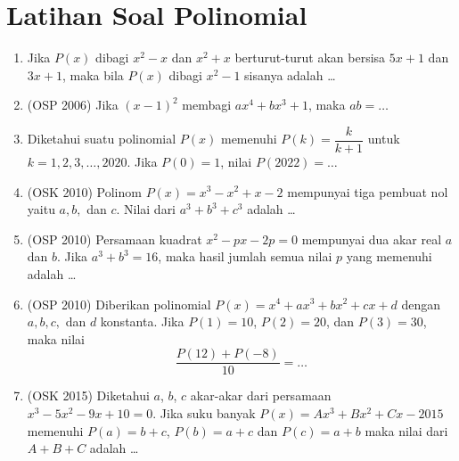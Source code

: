 \documentclass[12pt]{scrartcl}
\begin{document}
\section{Latihan Soal Polinomial}
\begin{enumerate}

\item Jika $P(x)$ dibagi $x^2-x$ dan $x^2+x$ berturut-turut akan bersisa $5x+1$ dan $3x+1$, maka bila $P(x)$ dibagi $x^2-1$ sisanya adalah \dots

\item (OSP 2006) Jika $(x-1)^2$ membagi $ax^4+bx^3+1$, maka $ab=\dots$

\item Diketahui suatu polinomial $P(x)$ memenuhi $P(k)=\dfrac{k}{k+1}$ untuk $k=1,2,3,\dots,2020$. Jika $P(0)=1$, nilai $P(2022)=\dots$

\item (OSK 2010) Polinom $P(x)=x^3-x^2+x-2$ mempunyai tiga pembuat nol yaitu $a,b,$ dan $c$. Nilai dari $a^3+b^3+c^3$ adalah \dots

\item (OSP 2010) Persamaan kuadrat $x^2-px-2p=0$ mempunyai dua akar real $a$ dan $b$. Jika $a^3+b^3=16$, maka hasil jumlah semua nilai $p$ yang memenuhi adalah \dots 

\item (OSP 2010) Diberikan polinomial $P(x)=x^4+ax^3+bx^2+cx+d$ dengan $a,b,c,$ dan $d$ konstanta. Jika $P(1)=10$, $P(2)=20$, dan  $P(3)=30$, maka nilai
$$\dfrac{P(12)+P(-8)}{10}=\dots$$

\item (OSK 2015) Diketahui $a$, $b$, $c$ akar-akar dari persamaan $x^3 - 5x^2 - 9x + 10 = 0$. Jika suku banyak $P(x) = Ax^3 + Bx^2 + Cx - 2015$ memenuhi $P(a) = b + c$, $P(b) = a + c$ dan $P(c) = a + b$ maka nilai dari $A + B + C$ adalah \ldots

\end{enumerate}
\end{document}
